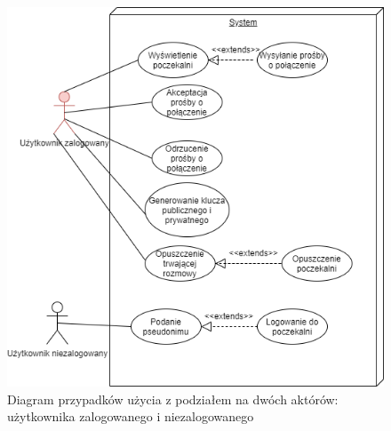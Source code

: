 \begin{figure}[H]
\includegraphics[width=\textwidth]{images/TIP-diagramPU.png}
\centering	
\caption{\centering Diagram przypadków użycia z podziałem na dwóch aktórów: użytkownika zalogowanego i niezalogowanego}
\end{figure}




